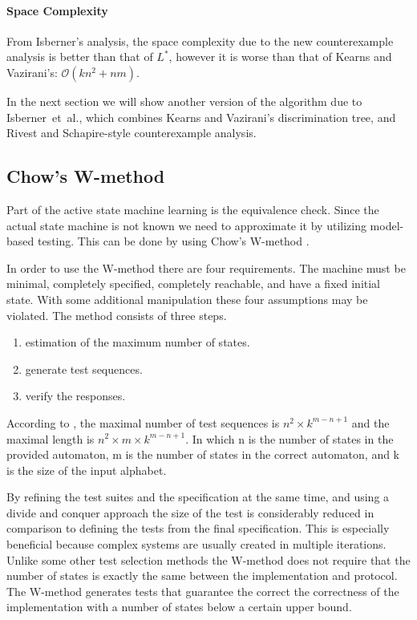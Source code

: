 \documentclass[multi,crop=false,class=article]{standalone}
\begin{document}
\paragraph{Space Complexity} From Isberner's analysis\cite{Isberner14b}, the
space complexity due to the new counterexample analysis is better than that of
$L^*$, however it is worse than that of Kearns and Vazirani's:
$\mathcal{O}(kn^2 + nm)$.

In the next section we will show another version of the algorithm due to
Isberner~et~al., which combines Kearns and Vazirani's discrimination tree, and
Rivest and Schapire-style counterexample analysis.

\subsection{Chow's W-method}
Part of the active state machine learning is the equivalence check.
Since the actual state machine is not known we need to approximate it by
utilizing model-based testing.
This can be done by using Chow's W-method \cite{deRuiter15, Chow78}.

In order to use the W-method there are four requirements.
The machine must be minimal, completely specified, completely reachable, 
and have a fixed initial state.
With some additional manipulation these four assumptions may be violated.
The method consists of three steps.
\begin{enumerate}
\item estimation of the maximum number of states.
\item generate test sequences.
\item verify the responses.
\end{enumerate}

According to \cite{vasilevskii73}, the maximal number of test sequences is 
$n^{2} \times k^{m-n+1}$ and the maximal length is 
$n^{2} \times m \times k^{m-n+1}$.
In which n is the number of states in the provided automaton, m is the number
of states in the correct automaton, and k is the size of the input alphabet.

By refining the test suites and the specification at the same time, and
using a divide and conquer approach the size of the test is
considerably reduced in comparison to defining the tests from
the final specification\cite{Ipate07}.
This is especially beneficial because complex systems are usually
created in multiple iterations.
Unlike some other test selection methods the W-method does not require
that the number of states is exactly the same between
the implementation and protocol.
The W-method generates tests that guarantee the correct the
correctness of the implementation with a number of states below a
certain upper bound.
\end{document}
